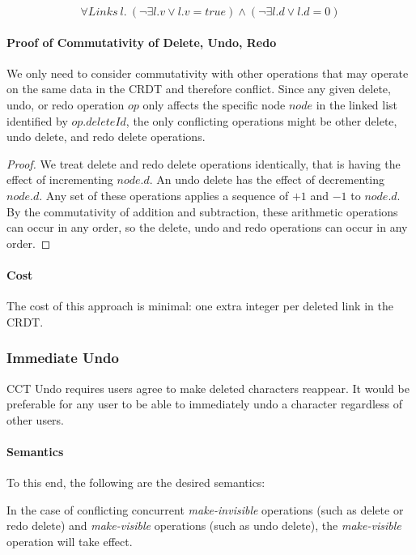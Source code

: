 \documentclass[12pt,a4paper,twoside,openright]{report}
\begin{document}
				\[\forall Links\ l.\  (\lnot\exists l.v \lor l.v = true) \land (\lnot\exists l.d \lor l.d = 0 ) \] 
			
			\paragraph{Proof of Commutativity of Delete, Undo, Redo}
			We only need to consider commutativity with other operations that may operate on the same data in the CRDT and therefore conflict. Since any given delete, undo, or redo operation $op$ only affects the specific node $node$ in the linked list identified by $op.deleteId$, the only conflicting operations might be other delete, undo delete, and redo delete operations.
			
			\begin{proof}
				We treat delete and redo delete operations identically, that is having the effect of incrementing $node.d$. An undo delete has the effect of decrementing $node.d$. Any set of these operations applies a sequence of $+1$ and $-1$ to $node.d$. By the commutativity of addition and subtraction, these arithmetic operations can occur in any order, so the delete, undo and redo operations can occur in any order.
			\end{proof}
			
			\paragraph{Cost}
			The cost of this approach is minimal: one extra integer per deleted link in the CRDT.
			
		\subsubsection{Immediate Undo} \label{sec:immediateundo}
		CCT Undo requires users agree to make deleted characters reappear. It would be preferable for any user to be able to immediately undo a character regardless of other users.
		
			\paragraph{Semantics}
			To this end, the following are the desired semantics:
			
			In the case of conflicting concurrent \textit{make-invisible} operations (such as delete or redo delete) and \textit{make-visible} operations (such as undo delete), the \textit{make-visible} operation will take effect.
			
\end{document}
